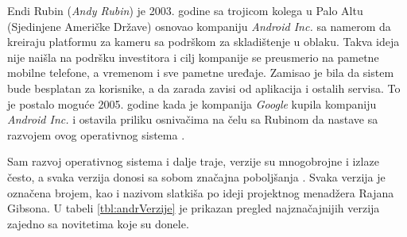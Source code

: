 \documentclass[android.tex]{subfiles}
\begin{document}
Endi Rubin (\textit{Andy Rubin}) je 2003. godine sa trojicom kolega u Palo Altu (Sjedinjene Američke Države) osnovao kompaniju \textit{Android Inc. }sa namerom da kreiraju platformu za kameru sa podrškom za skladištenje u oblaku. Takva ideja nije naišla na podršku investitora i cilj kompanije se preusmerio na  pametne mobilne telefone, a vremenom i sve pametne uređaje. Zamisao je bila da sistem bude besplatan za korisnike, a da zarada zavisi od aplikacija i ostalih servisa. To je postalo moguće 2005. godine kada je kompanija \textit{Google} kupila kompaniju \textit{Android Inc.} i ostavila priliku osnivačima na čelu sa Rubinom da nastave sa razvojem ovog operativnog sistema \cite{book:krajci}. 

Sam razvoj operativnog sistema i dalje traje, verzije su mnogobrojne i izlaze često, a svaka verzija donosi sa sobom značajna poboljšanja
 \cite{sajt:androidDevelopers,book:mzivkovic}.  Svaka verzija je označena brojem, kao i nazivom slatkiša po ideji projektnog menadžera Rajana Gibsona. U tabeli \ref{tbl:andrVerzije} je prikazan pregled najznačajnijih verzija zajedno sa novitetima koje su donele. 
\end{document}
